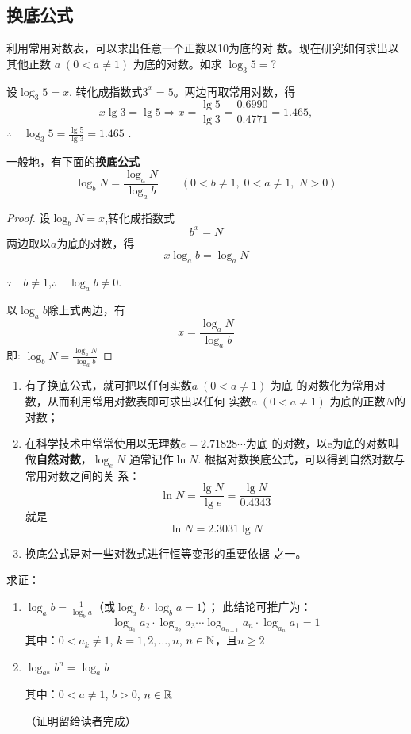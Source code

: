 \subsection{换底公式}
利用常用对数表，可以求出任意一个正数以10为底的对
数。现在研究如何求出以其他正数
$a\; (0<a\ne 1)$
为底的对数。如求
$\log_3 5=?$

设$\log_{3}5=x$, 转化成指数式$3^{x}=5$。两边再取常用对数，得
$$x\lg3=\lg5\Longrightarrow x=\frac{\lg5}{\lg3}=\frac{0.6990}{0.4771}=1.465,$$
$\therefore \quad \log_3 5= \frac {\lg 5}{\lg 3}= 1.465 $ .

一般地，有下面的\textbf{换底公式}
$$\log_{b}N=\frac{\log_{a}N}{\log_{a}b}\qquad (0<b\neq1,\; 0<a\neq1,\; N>0)$$

\begin{proof}
    设$\log_b N=x$,转化成指数式
$$b^{x}=N$$
两边取以$a$为底的对数，得
$$x\log_{a}b=\log_{a}N $$

$\because \quad b\neq1$,\qquad $\therefore \quad \log_a b\neq 0$.

以$\log_a b$除上式两边，有
\[x=\frac{\log_a N}{\log_a b}\]
即: $\log_b N=\frac{\log_a N}{\log_a b}$
\end{proof}

\begin{note}
\begin{enumerate}
    \item 有了换底公式，就可把以任何实数$a\; (0<a\ne 1)$
    为底
    的对数化为常用对数，从而利用常用对数表即可求出以任何
    实数$a\; (0<a\ne 1)$
    为底的正数$N$的对数；
    \item 在科学技术中常常使用以无理数$e=2.71828\cdots$为底
    的对数，以e为底的对数叫做\textbf{自然对数}，$\log_e N$
    通常记作$\ln N$. 
    根据对数换底公式，可以得到自然对数与常用对数之间的关
    系：
    \[\ln N=\frac{\lg N}{\lg e}=\frac{\lg N}{0.4343}\]
    就是
    \[\ln N=2.3031\lg N\]
\item 换底公式是对一些对数式进行恒等变形的重要依据
    之一。
\end{enumerate}
\end{note}

\begin{example}
求证：\begin{enumerate}[(1)]
    \item $\log_a b=\frac{1}{\log_b a}$\quad （或$\log_a b\cdot \log_b a=1$）；
此结论可推广为：
\[\log_{a_1}a_2\cdot \log_{a_2}a_3\cdots \log_{a_{n-1}}a_n\cdot \log_{a_n}a_1=1\]
其中：$0<a_k\ne 1$, $k=1,2,\ldots, n$, $n\in\mathbb{N}$，且$n\ge 2$

\item $\log_{a^n}b^n=\log_a b$

其中：$0<a\ne 1$, $b>0$, $n\in\mathbb{R}$

（证明留给读者完成）
\end{enumerate}
\end{example}

